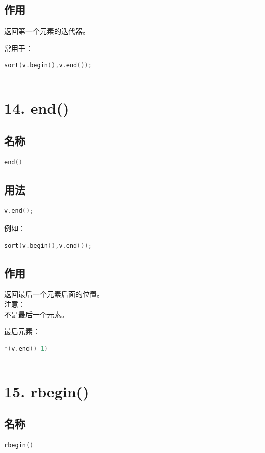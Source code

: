 \documentclass[10pt,twocolumn]{extarticle}
\begin{document}
\subsection{作用}
返回第一个元素的迭代器。

常用于：
\begin{lstlisting}[language=C++]
sort(v.begin(),v.end());
\end{lstlisting}

\noindent\rule{\linewidth}{0.4pt}

\section{14. end()}

\subsection{名称}
\begin{lstlisting}[language=C++]
end()
\end{lstlisting}

\subsection{用法}
\begin{lstlisting}[language=C++]
v.end();
\end{lstlisting}
例如：
\begin{lstlisting}[language=C++]
sort(v.begin(),v.end());
\end{lstlisting}

\subsection{作用}
返回最后一个元素后面的位置。\\
注意：\\
不是最后一个元素。

最后元素：
\begin{lstlisting}[language=C++]
*(v.end()-1)
\end{lstlisting}

\noindent\rule{\linewidth}{0.4pt}

\section{15. rbegin()}

\subsection{名称}
\begin{lstlisting}[language=C++]
rbegin()
\end{lstlisting}
\end{document}
